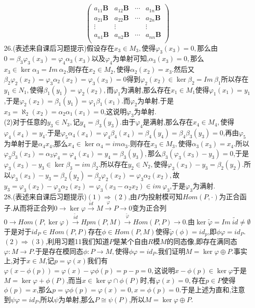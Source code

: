 \documentclass[b5paper]{ctexart}
\newcommand{\ess}[5]{$0\xrightarrow{}#1\xrightarrow{#2}#3\xrightarrow{#4}#5\xrightarrow{}0$}
\begin{document}
\[\left( \begin{array}{llll}
a_{11}\mathbf{B}& a_{12}\mathbf{B}&\cdots &a_{1n}\mathbf{B}\\
a_{21}\mathbf{B}& a_{22}\mathbf{B}&\cdots &a_{2n}\mathbf{B}\\
\vdots &\vdots &&\vdots\\
a_{n1}\mathbf{B}& a_{n2}\mathbf{B}&\cdots &a_{nn}\mathbf{B}\\
\end{array}\right) \]
26.(表述来自课后习题提示)假设存在$x_3\in M_3,$使得$ \varphi_3(x_3)=0,$那么由$0=\beta_3\varphi_3(x_3)=\varphi_4\alpha_3(x_3)$以及$\varphi_4$为单射可知,$\alpha_3(x_3)=0,$那么$x_3\in \ker \alpha_3=Im~\alpha_2$,则存在$x_2\in M_2,$使得$\alpha_2(x_2)=x_3$.然后又$\beta_2\varphi_2(x_2)=\varphi_3\alpha_2(x_2)=\varphi_3(x_3)=0$得到$\varphi_2(x_2)\in\ker \beta_2=Im~\beta_1$所以存在$y_1\in N_1,$使得$\beta_1(y_1)=\varphi_2(x_2),$而$\varphi_1$为满射,那么存在$x_1\in M_1$使得$\varphi_1(x_1)=y_1$,于是$\varphi_2(x_2)=\beta_1(y_1)=\varphi_1\beta_1(x_1).$而$\varphi_2$为单射.于是$x_3=\aleph_2(x_2)=\alpha_2\alpha_1(x_1)=0$,这说明$\varphi_3$为单射.\\
(2)对于任意的$y_3\in N_3,$记$y_4=\beta_3(y_3)$.由于$\varphi_4$是满射,那么存在$x_4\in M_4,$使得$\varphi_4(x_4)=y_4.$于是$\varphi_5\alpha_4(x_4)=\varphi_4\beta_4(x_4)=\beta_4(y_4)=\beta_4\beta_3(y_3)=0$,再由$\varphi_5$为单射于是$\alpha_4x_4$,那么$x_4\in\ker \alpha_4=im\alpha_3.$则存在$x_3\in M_3,$使得$\alpha_3(x_3)=x_4.$所以$\varphi_3\beta_3(x_3)=\alpha_3\varphi_4=\varphi_4(x_4)=y_4=\beta_3(y_3),$那么$\beta_3(\varphi_3(x_3)-y_3)=0$,于是$\varphi_3(x_3)-y_3\in\ker\beta_3=im~\beta_2$.所以存在$y_2\in N_2,$使得$\varphi_3(x_3)-y_3=\beta_2(y_2).$所以$\varphi_3(x_3)-y_3=\beta_2(y_2)=\beta_2\varphi_2(x_2)=\varphi_3\alpha_2(x_2),$故$y_3=\varphi_3(x_2)-\varphi_3\alpha_2(x_2)=\varphi_3(x_3-\alpha_2x_2)\in im~\varphi_3$,于是$\varphi_3$为满射.\\
28.(表述来自课后习题提示)$(1)\Rightarrow(2)$,由$P$为投射模可知$Hom(P,\cdot)$为正合函子.从而将正合列\ess{\ker\varphi}{id}{M}{\varphi}{P}变为正合列\ess{Hom(P,\ker\varphi)}{\tilde{id}}{Hpm(P,M)}{\tilde{\varphi}}{Hom(P,P)}.由$\ker\tilde{\varphi}=Im~\tilde{id}\neq\emptyset$于是对于$id_P\in Hom(P,P)$存在$\phi\in Hom(P,M)$使得$\tilde{\varphi}(\phi)=id_p$,即$\phi\varphi=id_P$.\\
$(2)\Rightarrow(3)$,利用习题11我们知道$P$是某个自由$R$模$M$的同态像,即存在满同态$\varphi:M\rightarrow P.$于是存在模同态$\phi:P\rightarrow M,$使得$\phi\varphi=id_P.$我们证明$M=\ker\varphi\oplus P$.事实上,对于$x\in M$,记$p=\varphi(x)$我们有$\varphi(x-\phi(p))=\varphi(x)-\varphi\phi(p)=p-p=0,$这说明$x-\phi(p)\in\ker \varphi$于是$M=\ker\varphi+\phi(P)$,而当$x\in\ker\varphi\cap\phi(P)$时,有$\varphi(x)=0,$存在$p\in P$使得$\phi(p)=x$,那么$p=\varphi\phi(p)=\varphi(x)=0,x=\phi(p)=0.$于是上述为直和,注意到$\psi\varphi=id_P$,所以$\psi$为单射,那么$P\cong\psi(P)$,所以$M=\ker\varphi\oplus P.$\\
\end{document}
